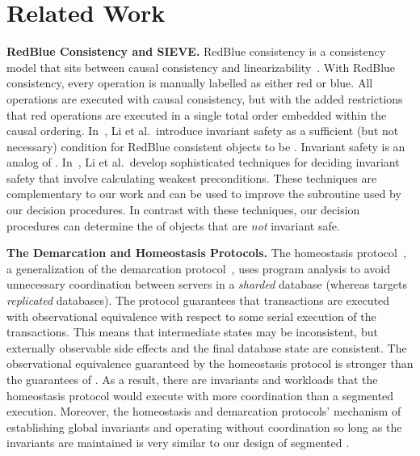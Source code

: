 \section{Related Work}

\newcommand{\sieve}{\textsc{SIEVE}}
\textbf{RedBlue Consistency and \sieve.}
RedBlue consistency is a consistency model that sits between causal consistency
and linearizability~\cite{li2012making}.
%
With RedBlue consistency, every operation is manually labelled as either red or
blue. All operations are executed with causal consistency, but with the added
restrictions that red operations are executed in a single total order embedded
within the causal ordering.
%
In~\cite{li2012making}, Li et al.\ introduce invariant safety as a
sufficient (but not necessary) condition for RedBlue consistent objects to be
\invariantconfluent{}. Invariant safety is an analog of \invariantclosure{}.
In~\cite{li2014automating}, Li et al.\ develop sophisticated techniques for
deciding invariant safety that involve calculating weakest preconditions. These
techniques are complementary to our work and can be used to improve the
\invariantclosure{} subroutine used by our decision procedures.
%
In contrast with these techniques, our \invariantconfluence{} decision
procedures can determine the \invariantconfluence{} of objects that are
\emph{not} invariant safe.

\textbf{The Demarcation and Homeostasis Protocols.}
The homeostasis protocol~\cite{roy2015homeostasis}, a generalization of the
demarcation protocol~\cite{barbara1994demarcation}, uses program analysis to
avoid unnecessary coordination between servers in a \emph{sharded} database
(whereas \invariantconfluence{} targets \emph{replicated} databases).  The
protocol guarantees that transactions are executed with observational
equivalence with respect to some serial execution of the transactions. This
means that intermediate states may be inconsistent, but externally observable
side effects and the final database state are consistent.  The observational
equivalence guaranteed by the homeostasis protocol is stronger than the
guarantees of \invariantconfluence{}. As a result, there are invariants and
workloads that the homeostasis protocol would execute with more coordination
than a segmented \invariantconfluent{} execution. Moreover, the homeostasis and
demarcation protocols' mechanism of establishing global invariants and
operating without coordination so long as the invariants are maintained is very
similar to our design of segmented \invariantconfluence{}.

